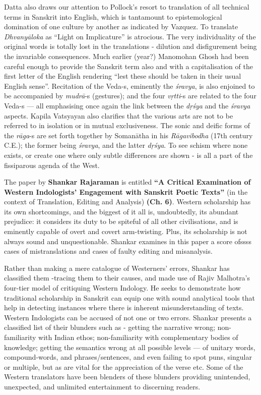Datta also draws our attention to Pollock’s resort to translation of all technical terms in Sanskrit into English, which is tantamount to epistemological domination of one culture by another as indicated by Vazquez. To translate \textsl{Dhvanyāloka} as “Light on Implicature” is atrocious. The very individuality of the original words is totally lost in the translations - dilution and disfigurement being the invariable consequences. Much earlier (year?) Manomohan Ghosh had been careful enough to provide the Sanskrit term also and with a capitalisation of the first letter of the English rendering “lest these should be taken in their usual English sense”. Recitation of the Veda-s, eminently the \textsl{śravya}, is also enjoined to be accompanied by \textsl{mudrā}-s (gestures); and the four \textsl{vṛtti}-s are related to the four Veda-s --- all emphasising once again the link between the \textsl{dṛśya} and the \textsl{śravya} aspects. Kapila Vatsyayan also clarifies that the various arts are not to be referred to in isolation or in mutual exclusiveness. The sonic and deific forms of the \textsl{rāga}-s are set forth together by Somanātha in his \textsl{Rāgavibodha} (17th century C.E.); the former being \textsl{śravya}, and the latter \textsl{dṛśya}. To see schism where none exists, or create one where only subtle differences are shown - is all a part of the fissiparous agenda of the West.

The paper by {\bf Shankar Rajaraman} is entitled {\bf “A Critical Examination of Western Indologists’ Engagement with Sanskrit Poetic Texts”} (in the context of Translation, Editing and Analysis) {\bf(Ch. 6)}. Western scholarship has its own shortcomings, and the biggest of it all is, undoubtedly, its abundant prejudice: it considers its duty to be spiteful of all other civilisations, and is eminently capable of overt and covert arm-twisting. Plus, its scholarship is not always sound and unquestionable. Shankar examines in this paper a score ofssss cases of mistranslations and cases of faulty editing and misanalysis. 

Rather than making a mere catalogue of Westerners’ errors, Shankar has classified them -tracing them to their causes, and made use of Rajiv Malhotra’s four-tier model of critiquing Western Indology. He seeks to demonstrate how traditional scholarship in Sanskrit can equip one with sound analytical tools that help in detecting instances where there is inherent misunderstanding of texts. Western Indologists can be accused of not one or two errors. Shankar presents a classified list of their blunders such as - getting the narrative wrong; non-familiarity with Indian ethos; non-familiarity with complementary bodies of knowledge; getting the semantics wrong at all possible levels --- of unitary words, compound-words, and phrases/sentences, and even failing to spot puns, singular or multiple, but as are vital for the appreciation of the verse etc. Some of the Western translators have been blenders of these blunders providing unintended, unexpected, and unlimited entertainment to discerning readers. 

